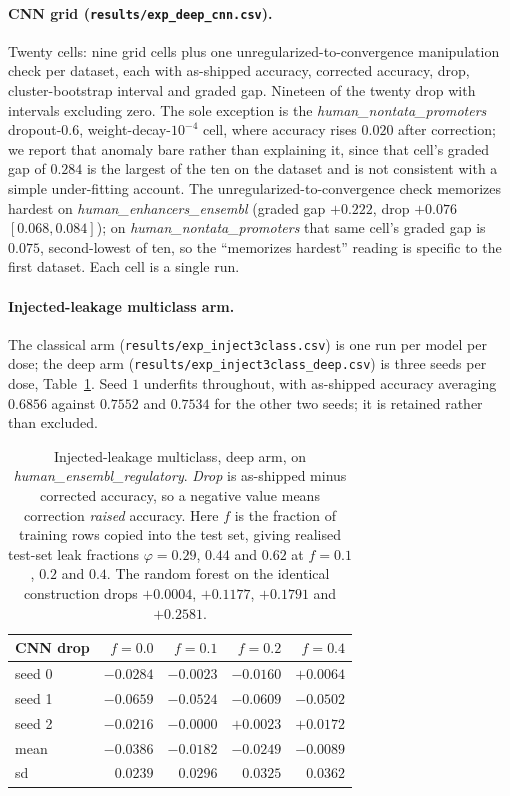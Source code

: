 \documentclass[11pt,a4paper]{article}
\begin{document}
\paragraph{CNN grid (\texttt{results/exp\_deep\_cnn.csv}).} Twenty cells: nine grid cells plus one
unregularized-to-convergence manipulation check per dataset, each with as-shipped accuracy,
corrected accuracy, drop, cluster-bootstrap interval and graded gap. Nineteen of the twenty drop
with intervals excluding zero. The sole exception is the \textit{human\_nontata\_promoters}
dropout-$0.6$, weight-decay-$10^{-4}$ cell, where accuracy rises $0.020$ after correction; we report
that anomaly bare rather than explaining it, since that cell's graded gap of $0.284$ is the largest
of the ten on the dataset and is not consistent with a simple under-fitting account. The
unregularized-to-convergence check memorizes hardest on \textit{human\_enhancers\_ensembl} (graded
gap $+0.222$, drop $+0.076$ $[0.068,0.084]$); on \textit{human\_nontata\_promoters} that same cell's
graded gap is $0.075$, second-lowest of ten, so the ``memorizes hardest'' reading is specific to the
first dataset. Each cell is a single run.

\paragraph{Injected-leakage multiclass arm.} The classical arm
(\texttt{results/exp\_inject3class.csv}) is one run per model per dose; the deep arm
(\texttt{results/exp\_inject3class\_deep.csv}) is three seeds per dose, Table~\ref{tab:injdeep}.
Seed $1$ underfits throughout, with as-shipped accuracy averaging $0.6856$ against $0.7552$ and
$0.7534$ for the other two seeds; it is retained rather than excluded.

\begin{table}[htbp]
\centering
\caption{Injected-leakage multiclass, deep arm, on \textit{human\_ensembl\_regulatory}.
\emph{Drop} is as-shipped minus corrected accuracy, so a negative value means correction
\emph{raised} accuracy. Here $f$ is the fraction of training rows copied into the test set, giving
realised test-set leak fractions $\varphi=0.29$, $0.44$ and $0.62$ at $f=0.1$, $0.2$ and $0.4$. The
random forest on the identical construction drops $+0.0004$, $+0.1177$, $+0.1791$ and
$+0.2581$.}\label{tab:injdeep}
\footnotesize
\begin{tabular}{@{}lrrrr@{}}
\toprule
CNN drop & $f=0.0$ & $f=0.1$ & $f=0.2$ & $f=0.4$\\
\midrule
seed 0 & $-0.0284$ & $-0.0023$ & $-0.0160$ & $+0.0064$\\
seed 1 & $-0.0659$ & $-0.0524$ & $-0.0609$ & $-0.0502$\\
seed 2 & $-0.0216$ & $-0.0000$ & $+0.0023$ & $+0.0172$\\
\midrule
mean   & $-0.0386$ & $-0.0182$ & $-0.0249$ & $-0.0089$\\
sd     & $0.0239$  & $0.0296$  & $0.0325$  & $0.0362$\\
\bottomrule
\end{tabular}
\end{table}
\end{document}
